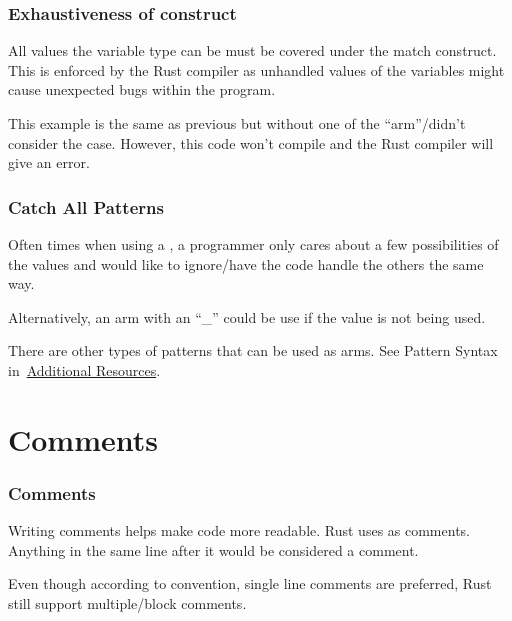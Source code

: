 \documentclass{beamer}
\begin{document}
\begin{frame}
  \frametitle{Exhaustiveness of  construct}
  All values the variable type can be must be covered under the match construct. This is enforced by the Rust compiler as unhandled values of the variables might cause unexpected bugs within the program.
  
  This example is the same as previous but without one of the ``arm''/didn't consider the  case. However, this code won't compile and the Rust compiler will give an error.
\end{frame}

\begin{frame}[allowframebreaks]
  \frametitle{Catch All Patterns}
  Often times when using a , a programmer only cares about a few possibilities of the values and would like to ignore/have the code handle the others the same way.
  

  \newpage

  Alternatively, an arm with an ``\_'' could be use if the value is not being used.
  

  There are other types of patterns that can be used as  arms. See Pattern Syntax in~\hyperlink{Additional Resources}{Additional Resources}.
\end{frame}

\section{Comments}
\begin{frame}[allowframebreaks]
  \frametitle{Comments}
  Writing comments helps make code more readable. Rust uses \inlinecode{//} as comments. Anything in the same line after it would be considered a comment.
  

  Even though according to convention, single line comments are preferred, Rust still support multiple/block comments.
  
\end{frame}
\end{document}
